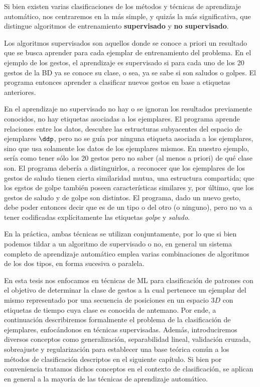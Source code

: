 
Si bien existen varias clasificaciones de los métodos y técnicas de aprendizaje automático, nos centraremos en la más simple, y quizás la más significativa, que distingue algoritmos de entrenamiento \textbf{supervisado} y \textbf{no supervisado}. 

Los algoritmos supervisados son aquellos donde se conoce a priori un resultado que se busca aprender para cada ejemplar de entrenamiento del problema. En el ejemplo de los gestos, el aprendizaje es supervisado si para cada uno de los 20 gestos de la BD ya se conoce su clase, o sea, ya se sabe si son saludos o golpes. El programa entonces aprender a clasificar nuevos gestos en base a etiquetas anteriores.

En el aprendizaje no supervisado no hay o se ignoran los resultados previamente conocidos, no hay etiquetas asociadas a los ejemplares. El programa aprende relaciones entre los datos, descubre las estructuras subyacentes del espacio de ejemplares $\ddp$, pero no se guía por ninguna etiqueta asociada a los ejemplares, sino que usa solamente los datos de los ejemplares mismos. En nuestro ejemplo, sería como tener sólo los 20 gestos pero no saber (al menos a priori) de qué clase son. El programa debería a distinguirlos, a reconocer que los ejemplares de los gestos de saludo tienen cierta similaridad mutua, una estructura compartida; que los egstos de golpe también poseen características similares y, por último, que los gestos de saludo y de golpe son distintos. El programa, dado un nuevo gesto, debe poder entonces decir que es de un tipo o del otro (o ninguno), pero no va a tener codificadas explícitamente las etiquetas \textit{golpe} y \textit{saludo}.

En la práctica, ambas técnicas se utilizan conjuntamente, por lo que si bien podemos tildar a un algoritmo de supervisado o no, en general un sistema completo de aprendizaje automático emplea varias combinaciones de algoritmos de los dos tipos, en forma sucesiva o paralela.

En esta tesis nos enfocamos en técnicas de ML para clasificación de patrones con el objetivo de determinar la clase de gestos a la cual pertenece un ejemplar del mismo representado por una secuencia de posiciones en un espacio $3D$ con etiquetas de tiempo cuya clase es conocida de antemano. Por ende, a continuación describiremos formalmente el problema de la clasificación de ejemplares, enfocándonos en técnicas supervisadas. Además, introduciremos diversos conceptos como generalización, separabilidad lineal, validación cruzada, sobreajuste y regularización para establecer una base teórica común a los métodos de clasificación descriptos en el siguiente capítulo. Si bien por conveniencia tratamos dichos conceptos en el contexto de clasificación, se aplican en general a la mayoría de las técnicas de aprendizaje automático.

